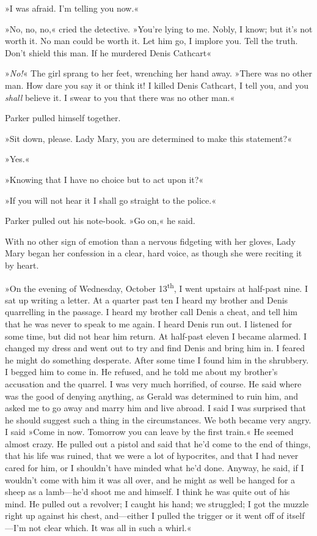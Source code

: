 »I was afraid. I'm telling you now.«

»No, no, no,« cried the detective. »You're lying to me. Nobly, I know; but it's not worth it. No man could be worth it. Let him go, I implore you. Tell the truth. Don't shield this man. If he murdered Denis Cathcart\longdash«

»\textit{No!}« The girl sprang to her feet, wrenching her hand away. »There was no other man. How dare you say it or think it! I killed Denis Cathcart, I tell you, and you \textit{shall} believe it. I swear to you that there was no other man.«

Parker pulled himself together.

»Sit down, please. Lady Mary, you are determined to make this statement?«

»Yes.«

»Knowing that I have no choice but to act upon it?«

»If you will not hear it I shall go straight to the police.«

Parker pulled out his note-book. »Go on,« he said.

With no other sign of emotion than a nervous fidgeting with her gloves, Lady Mary began her confession in a clear, hard voice, as though she were reciting it by heart.

»On the evening of Wednesday, October 13\textsuperscript{th}, I went upstairs at half-past nine. I sat up writing a letter. At a quarter past ten I heard my brother and Denis quarrelling in the passage. I heard my brother call Denis a cheat, and tell him that he was never to speak to me again. I heard Denis run out. I listened for some time, but did not hear him return. At half-past eleven I became alarmed. I changed my dress and went out to try and find Denis and bring him in. I feared he might do something desperate. After some time I found him in the shrubbery. I begged him to come in. He refused, and he told me about my brother's accusation and the quarrel. I was very much horrified, of course. He said where was the good of denying anything, as Gerald was determined to ruin him, and asked me to go away and marry him and live abroad. I said I was surprised that he should suggest such a thing in the circumstances. We both became very angry. I said »Come in now.  Tomorrow you can leave by the first train.« He seemed almost crazy. He pulled out a pistol and said that he'd come to the end of things, that his life was ruined, that we were a lot of hypocrites, and that I had never cared for him, or I shouldn't have minded what he'd done. Anyway, he said, if I wouldn't come with him it was all over, and he might as well be hanged for a sheep as a lamb—he'd shoot me and himself. I think he was quite out of his mind. He pulled out a revolver; I caught his hand; we struggled; I got the muzzle right up against his chest, and—either I pulled the trigger or it went off of itself—I'm not clear which. It was all in such a whirl.«

